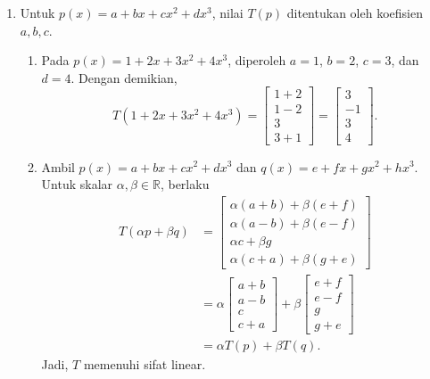 \documentclass[11pt,a4paper]{article}
\newcommand{\R}{\mathbb{R}}
\begin{document}
\begin{enumerate}[itemsep=12pt,parsep=5pt]
  \item Untuk $p(x)=a+bx+cx^2+dx^3$, nilai $T(p)$ ditentukan oleh koefisien $a,b,c$.
        \begin{enumerate}
          \item Pada $p(x)=1+2x+3x^2+4x^3$, diperoleh $a=1$, $b=2$, $c=3$, dan $d=4$.
                Dengan demikian,
                \[
                  T(1+2x+3x^2+4x^3)
                  =\begin{bmatrix}1+2\\1-2\\3\\3+1\end{bmatrix}
                  =\begin{bmatrix}3\\-1\\3\\4\end{bmatrix}.
                \]

          \item Ambil $p(x)=a+bx+cx^2+dx^3$ dan $q(x)=e+fx+gx^2+hx^3$.
                Untuk skalar $\alpha,\beta\in\R$, berlaku
                \begin{align*}
                  T(\alpha p+\beta q)
                   & =\begin{bmatrix}
                        \alpha(a+b)+\beta(e+f) \\
                        \alpha(a-b)+\beta(e-f) \\
                        \alpha c+\beta g       \\
                        \alpha(c+a)+\beta(g+e)
                      \end{bmatrix}                           \\
                   & =\alpha\begin{bmatrix}a+b\\a-b\\c\\c+a\end{bmatrix}
                  +\beta\begin{bmatrix}e+f\\e-f\\g\\g+e\end{bmatrix}     \\
                   & =\alpha T(p)+\beta T(q).
                \end{align*}
                Jadi, $T$ memenuhi sifat linear.


\end{enumerate}
\end{enumerate}
\end{document}
